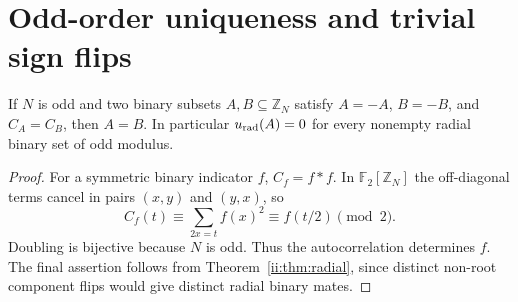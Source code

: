 \section{Odd-order uniqueness and trivial sign flips}

\begin{proposition}\label{ii:prop:odd}
If $N$ is odd and two binary subsets $A,B\subseteq\mathbb Z_N$ satisfy $A=-A$, $B=-B$, and $C_A=C_B$, then $A=B$.  In particular $u_{\rm rad}(A)=0$ for every nonempty radial binary set of odd modulus.
\end{proposition}
\begin{proof}
For a symmetric binary indicator $f$, $C_f=f*f$.  In $\mathbb F_2[\mathbb Z_N]$ the off-diagonal terms cancel in pairs $(x,y)$ and $(y,x)$, so
\[
 C_f(t)\equiv\sum_{2x=t}f(x)^2\equiv f(t/2)\pmod2.
\]
Doubling is bijective because $N$ is odd.  Thus the autocorrelation determines $f$.  The final assertion follows from Theorem~\ref{ii:thm:radial}, since distinct non-root component flips would give distinct radial binary mates.
\end{proof}

